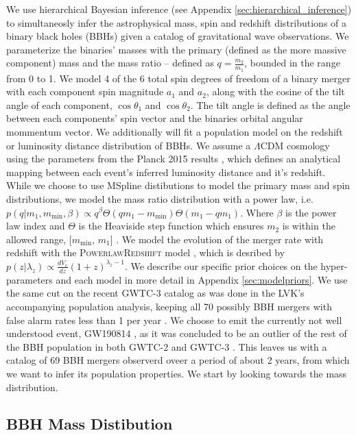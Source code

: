 We use hierarchical Bayesian inference (see Appendix \ref{sec:hierarchical_inference}) to simultaneosly infer the astrophysical mass, spin and redshift distributions of 
a binary black holes (BBHs) given a catalog of gravitational wave observations. We parameterize the binaries' masses with the primary (defined as the more massive component) mass 
and the mass ratio -- defined as $q=\frac{m_2}{m_1}$, bounded in the range from 0 to 1. We model 4 of the 6 total 
spin degrees of freedom of a binary merger with each component spin magnitude $a_1$ and $a_2$, along with the cosine of the tilt angle of each component, 
$\cos{\theta_1}$ and $\cos{\theta_2}$. The tilt angle is defined as the angle between each components' spin vector and the binaries orbital angular mommentum vector. 
We additionally will fit a population model on the redshift or luminosity distance distribution of BBHs. We assume a $\Lambda\mathrm{CDM}$ cosmology using the 
parameters from the Planck 2015 results \cite{Planck2015}, which defines an analytical mapping between each event's inferred
luminosity distance and it's redshift. While we choose to use MSpline distibutions to model the primary mass and spin distributions, we 
model the mass ratio distribution with a power law, i.e. $p(q | m_1, m_\mathrm{min}, \beta) \propto q^{\beta} \Theta(qm_1 - m_\mathrm{min}) \Theta(m_1 - qm_1)$. 
Where $\beta$ is the power law index and $\Theta$ is the Heaviside step function which ensures $m_2$ is within the allowed range, [$m_\mathrm{min}$, $m_1$] \cite{Talbot_2019,o1o2_pop,o3a_pop}.
We model the evolution of the merger rate with redshift with the \textsc{PowerlawRedshift} model \cite{Fishbach_2018redshift}, which is desribed by 
$p(z|\lambda_z)\propto \frac{dV_c}{dz}(1+z)^{\lambda_z-1}$. We describe our specific prior choices on the hyper-parameters and each model 
in more detail in Appendix \ref{sec:modelpriors}. We use the same cut on the recent GWTC-3 catalog as was done in the LVK's accompanying population analysis, 
keeping all 70 possibly BBH mergers with false alarm rates less than 1 per year \cite{GWTC3,o3b_astro_dist}. We choose to emit the currently not well understood event, 
GW190814 \cite{190814disc}, as it was concluded to be an outlier of the rest of the BBH population in both GWTC-2 and GWTC-3 \cite{o3a_pop,o3b_astro_dist,Essick_2022}. 
This leaves us with a catalog of 69 BBH mergers observerd oveer a period of about 2 years, from which we want to infer its population properties. 
We start by looking towards the mass distribution.

\subsection{BBH Mass Distibution} \label{sec:mass_dist}

